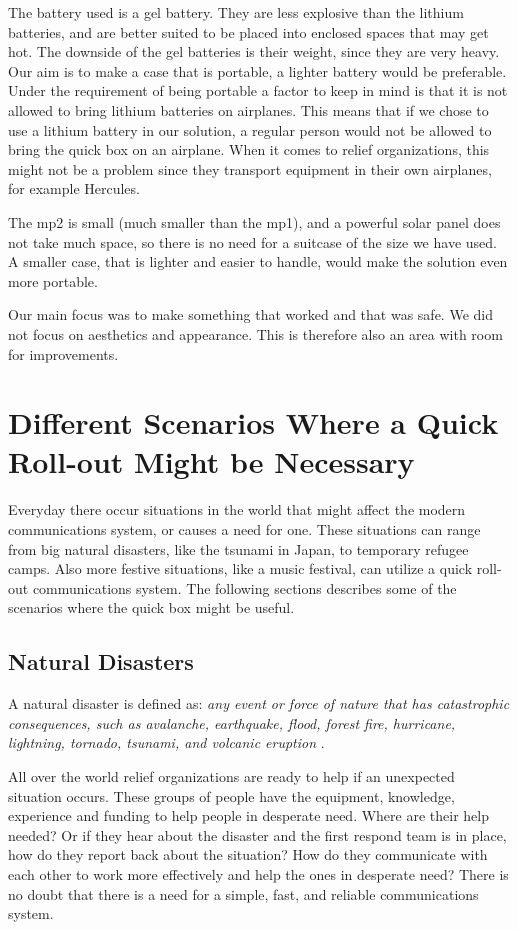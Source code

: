 The battery used is a gel battery. They are less explosive than the lithium batteries, and are better suited to be placed into enclosed spaces that may get hot. The downside of the gel batteries is their weight, since they are very heavy. Our aim is to make a case that is portable, a lighter battery would be preferable. Under the requirement of being portable a factor to keep in mind is that it is not allowed to bring lithium batteries on airplanes. This means that if we chose to use a lithium battery in our solution, a regular person would not be allowed to bring the \gls{quick} box on an airplane. When it comes to relief organizations, this might not be a problem since they transport equipment in their own airplanes, for example Hercules. 

The \gls{mp2} is small (much smaller than the \gls{mp1}), and a powerful solar panel does not take much space, so there is no need for a suitcase of the size we have used. A smaller case, that is lighter and easier to handle, would make the solution even more portable. 

Our main focus was to make something that worked and that was safe. We did not focus on aesthetics and appearance. This is therefore also an area with room for improvements. 

 
\section{Different Scenarios Where a Quick Roll-out Might be Necessary}
Everyday there occur situations in the world that might affect the modern communications system, or causes a need for one. These situations can range from big natural disasters, like the tsunami in Japan, to temporary refugee camps. Also more festive situations, like a music festival, can utilize a quick roll-out communications system. The following sections describes some of the scenarios where the \gls{quick} box might be useful. 

\subsection{Natural Disasters}
A natural disaster is defined as: \textit{any event or force of nature that has catastrophic consequences, such as avalanche, earthquake, flood, forest fire, hurricane, lightning, tornado, tsunami, and volcanic eruption} \cite{naturalDisaster}.

All over the world relief organizations are ready to help if an unexpected situation occurs. These groups of people have the equipment, knowledge, experience and funding to help people in desperate need. Where are their help needed? Or if they hear about the disaster and the first respond team is in place, how do they report back about the situation? How do they communicate with each other to work more effectively and help the ones in desperate need? There is no doubt that there is a need for a simple, fast, and reliable communications system.

